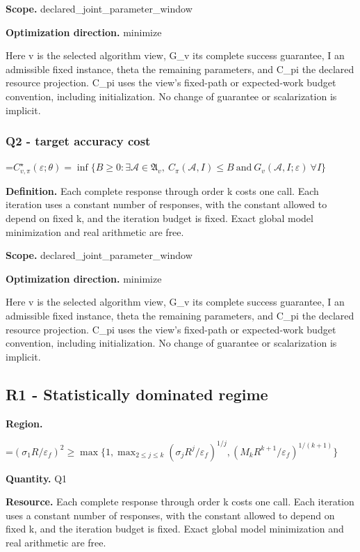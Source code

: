 \documentclass[10pt,a4paper]{article}
\newcommand{\AtlasMath}[1]{\par\begingroup\centering\setbox0=\hbox{$\displaystyle #1$}\ifdim\wd0>1.4\linewidth\typeout{ATLAS WIDE FORMULA: \the\wd0}\fi\ifdim\wd0>\linewidth\resizebox{\linewidth}{!}{\box0}\else\box0\fi\par\endgroup}
\begin{document}
\textbf{Scope.} declared\_joint\_parameter\_window

\textbf{Optimization direction.} minimize

Here v is the selected algorithm view, G\_v its complete success guarantee, I an admissible fixed instance, theta the remaining parameters, and C\_pi the declared resource projection. C\_pi uses the view's fixed-path or expected-work budget convention, including initialization. No change of guarantee or scalarization is implicit.

\subsubsection{Q2 - target accuracy cost}
\AtlasMath{C^\star_{v,\pi}(\varepsilon;\theta)=\inf\{B\ge0:\exists\mathcal A\in\mathfrak A_v,\ C_\pi(\mathcal A,I)\le B\ \text{and}\ G_v(\mathcal A,I;\varepsilon)\ \forall I\}}
\textbf{Definition.} Each complete response through order k costs one call. Each iteration uses a constant number of responses, with the constant allowed to depend on fixed k, and the iteration budget is fixed. Exact global model minimization and real arithmetic are free.

\textbf{Scope.} declared\_joint\_parameter\_window

\textbf{Optimization direction.} minimize

Here v is the selected algorithm view, G\_v its complete success guarantee, I an admissible fixed instance, theta the remaining parameters, and C\_pi the declared resource projection. C\_pi uses the view's fixed-path or expected-work budget convention, including initialization. No change of guarantee or scalarization is implicit.

\subsection{R1 - Statistically dominated regime}
\textbf{Region.} 
\AtlasMath{(\sigma_1R/\varepsilon_f)^2\ge\max\{1,\max_{2\le j\le k}(\sigma_jR^j/\varepsilon_f)^{1/j},(M_kR^{k+1}/\varepsilon_f)^{1/(k+1)}\}}


\textbf{Quantity.} Q1

\textbf{Resource.} Each complete response through order k costs one call. Each iteration uses a constant number of responses, with the constant allowed to depend on fixed k, and the iteration budget is fixed. Exact global model minimization and real arithmetic are free.
\end{document}
